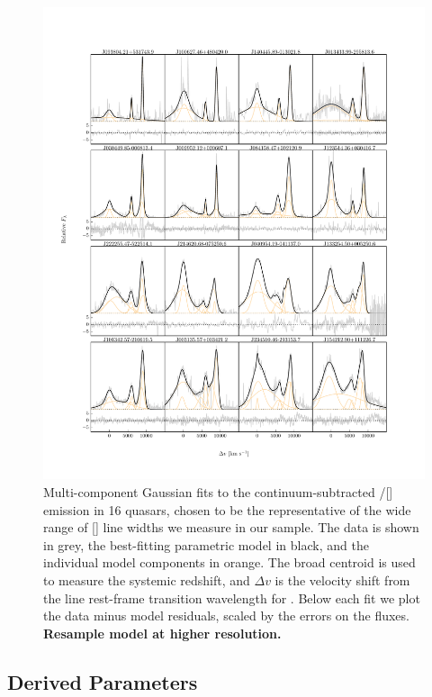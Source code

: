 \begin{figure}
    \includegraphics[width=\textwidth]{figures/chapter04/example_spectrum_grid.pdf} 
    \caption{Multi-component Gaussian fits to the continuum-subtracted \hbns/[] emission in 16 quasars, chosen to be the representative of the wide range of [] line widths we measure in our sample. The data is shown in grey, the best-fitting parametric model in black, and the individual model components in orange. The broad \hb centroid is used to measure the systemic redshift, and $\Delta{v}$ is the velocity shift from the line rest-frame transition wavelength for \hbns. Below each fit we plot the data minus model residuals, scaled by the errors on the fluxes. {\bf Resample model at higher resolution.}}     
    \label{fig:example_spectrum_grid}
\end{figure}

\subsection{Derived Parameters}

